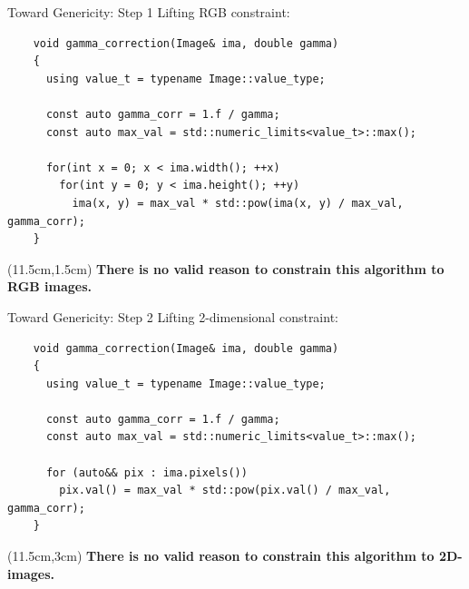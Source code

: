 \documentclass[12pt,aspectratio=169]{beamer}
\begin{document}
\begin{frame}[fragile]{Toward Genericity: Step 1}
  Lifting RGB constraint:
  \begin{verbatim}
    void gamma_correction(Image& ima, double gamma)
    {
      using value_t = typename Image::value_type;

      const auto gamma_corr = 1.f / gamma;
      const auto max_val = std::numeric_limits<value_t>::max();
    
      for(int x = 0; x < ima.width(); ++x)
        for(int y = 0; y < ima.height(); ++y)
          ima(x, y) = max_val * std::pow(ima(x, y) / max_val, gamma_corr);
    }
  \end{verbatim}
  \begin{textblock*}{4cm}(11.5cm,1.5cm)
    \textbf{There is no valid reason to constrain this algorithm to RGB images.}
  \end{textblock*}
  \pdfcomment[icon=Note]{   }
  \pdfcomment[icon=Note]{   }
\end{frame}

\begin{frame}[fragile]{Toward Genericity: Step 2}
  Lifting 2-dimensional constraint:
  \begin{verbatim}
    void gamma_correction(Image& ima, double gamma)
    {
      using value_t = typename Image::value_type;

      const auto gamma_corr = 1.f / gamma;
      const auto max_val = std::numeric_limits<value_t>::max();
    
      for (auto&& pix : ima.pixels())
        pix.val() = max_val * std::pow(pix.val() / max_val, gamma_corr);
    }
  \end{verbatim}
  \begin{textblock*}{4cm}(11.5cm,3cm)
    \textbf{There is no valid reason to constrain this algorithm to 2D-images.}
  \end{textblock*}
  \pdfcomment[icon=Note]{   }
\end{frame}
\end{document}
